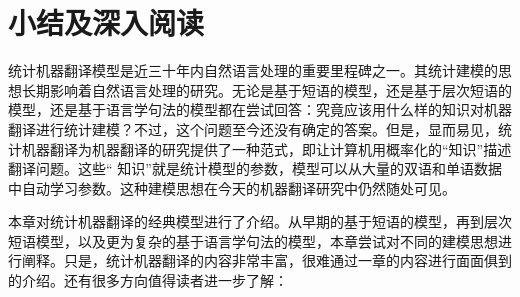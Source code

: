 \sectionnewpage
\section{小结及深入阅读}\label{section-4.5}

\parinterval 统计机器翻译模型是近三十年内自然语言处理的重要里程碑之一。其统计建模的思想长期影响着自然语言处理的研究。无论是基于短语的模型，还是基于层次短语的模型，还是基于语言学句法的模型都在尝试回答：究竟应该用什么样的知识对机器翻译进行统计建模？不过，这个问题至今还没有确定的答案。但是，显而易见，统计机器翻译为机器翻译的研究提供了一种范式，即让计算机用概率化的``知识''描述翻译问题。这些`` 知识''就是统计模型的参数，模型可以从大量的双语和单语数据中自动学习参数。这种建模思想在今天的机器翻译研究中仍然随处可见。

\parinterval 本章对统计机器翻译的经典模型进行了介绍。从早期的基于短语的模型，再到层次短语模型，以及更为复杂的基于语言学句法的模型，本章尝试对不同的建模思想进行阐释。只是，统计机器翻译的内容非常丰富，很难通过一章的内容进行面面俱到的介绍。还有很多方向值得读者进一步了解：

